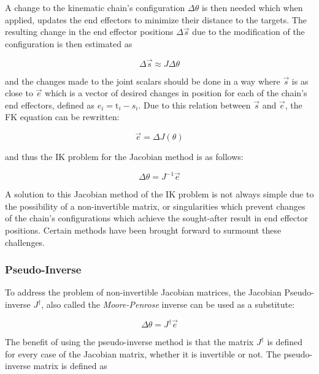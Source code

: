 A change to the kinematic chain's configuration \(\Delta \theta\) is then needed
which when applied, updates the end effectors to minimize their distance to the
targets. The resulting change in the end effector positions \(\Delta \vec{s}\)
due to the modification of the configuration is then estimated as

\begin{equation}
    \Delta \vec{s} \approx J \Delta \theta
\end{equation}

and the changes made to the joint scalars should be done in a way where
\(\vec{s}\) is as close to \(\vec{e}\) which is a vector of desired changes in position
for each of the chain's end effectors, defined as \(e_i = \mbox{t}_i - s_i\).
Due to this relation between \(\vec{s}\) and \(\vec{e}\), the FK equation can
be rewritten:

\begin{equation}
    \vec{e} = \Delta J(\theta)
\end{equation}

and thus the IK problem for the Jacobian method is as follows:

\begin{equation}
    \Delta \theta = J^{-1} \vec{e}
\end{equation}

A solution to this Jacobian method of the IK problem is not always simple due to
the possibility of a non-invertible matrix, or singularities which prevent
changes of the chain's configurations which achieve the sought-after result in
end effector positions. Certain methods have been brought forward to surmount
these challenges.

\subsubsection{Pseudo-Inverse}
To address the problem of non-invertible Jacobian matrices, the Jacobian
Pseudo-inverse \(J^\dagger\), also called the \textit{Moore-Penrose} inverse can be used as
a substitute:

\begin{equation}
    \Delta \theta = J^{\dagger}\vec{e}
\end{equation}

The benefit of using the pseudo-inverse method is that the matrix \(J^\dagger\)
is defined for every case of the Jacobian matrix, whether it is invertible or
not. The pseudo-inverse matrix is defined as

